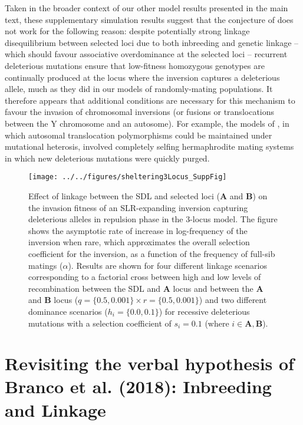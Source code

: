 \documentclass{article}
\def\mbf#1{\mathbf{#1}}
\begin{document}
\begin{appendices}
Taken in the broader context of our other model results presented in the main text, these supplementary simulation results suggest that the conjecture of \citet{CharlesworthWall1999} does not work for the following reason: despite potentially strong linkage disequilibrium between selected loci due to both inbreeding and genetic linkage -- which should favour associative overdominance at the selected loci -- recurrent deleterious mutations ensure that low-fitness homozygous genotypes are continually produced at the locus where the inversion captures a deleterious allele, much as they did in our models of randomly-mating populations. It therefore appears that additional conditions are necessary for this mechanism to favour the invasion of chromosomal inversions (or fusions or translocations between the Y chromosome and an autosome). For example, the models of \citet{deWaalMaleFijtCharlesworth1979}, in which autosomal translocation polymorphisms could be maintained under mutational heterosis, involved completely selfing hermaphrodite mating systems in which new deleterious mutations were quickly purged. 



 \begin{figure}[htbp]
 \centering
 \texttt{[image: ../../figures/sheltering3Locus\_SuppFig]}
 \caption{Effect of linkage between the SDL and selected loci ($\mbf{A}$ and $\mbf{B}$) on the invasion fitness of an SLR-expanding inversion capturing deleterious alleles in repulsion phase in the 3-locus model. The figure shows the asymptotic rate of increase in log-frequency of the inversion when rare, which approximates the overall selection coefficient for the inversion, as a function of the frequency of full-sib matings ($\alpha$). Results are shown for four different linkage scenarios corresponding to a factorial cross between high and low levels of recombination between the SDL and $\mbf{A}$ locus and between the $\mbf{A}$ and $\mbf{B}$ locus ($q = \{0.5, 0.001\} \times r = \{0.5, 0.001\}$) and two different dominance scenarios ($h_{i} = \{ 0.0, 0.1 \}$) for recessive deleterious mutations with a selection coefficient of $s_i = 0.1$ (where $i \in {\mbf{A}, \mbf{B}}$).}
 \label{fig:3Loc-Sheltering-QR}
 \end{figure}







\newpage
 \section{Revisiting the verbal hypothesis of Branco et al. (2018): Inbreeding and Linkage} \label{Branco-App}
 \renewcommand{\theequation}{E\arabic{equation}}
 \setcounter{equation}{0}
 \renewcommand{\thefigure}{E\arabic{figure}}
 \setcounter{figure}{0}


\end{appendices}
\end{document}
